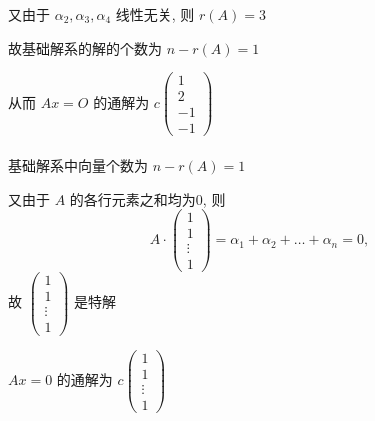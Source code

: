 		 又由于 \( \alpha_{2}, \alpha_{3}, \alpha_{4} \) 线性无关, 则 \( r(A) = 3 \)

		 故基础解系的解的个数为 \( n - r(A) = 1 \)

		 从而 \( Ax = O \) 的通解为 \( c \begin{pmatrix}
			 1  \\
			 2  \\
			 -1 \\
			 -1
		 \end{pmatrix} \)


	 \paragraph{} %
		 基础解系中向量个数为 \( n - r(A) = 1 \)

		 又由于 \( A \) 的各行元素之和均为0, 则
		 \[ A \cdot \begin{pmatrix}
				 1      \\
				 1      \\
				 \vdots \\
				 1
			 \end{pmatrix} = \alpha_{1} + \alpha_{2} + \dots + \alpha_{n} = 0, \] 故 \( \begin{pmatrix}
			 1      \\
			 1      \\
			 \vdots \\
			 1
		 \end{pmatrix} \) 是特解

		 \( Ax = 0 \) 的通解为 \( c \begin{pmatrix}
			 1      \\
			 1      \\
			 \vdots \\
			 1
		 \end{pmatrix} \)


